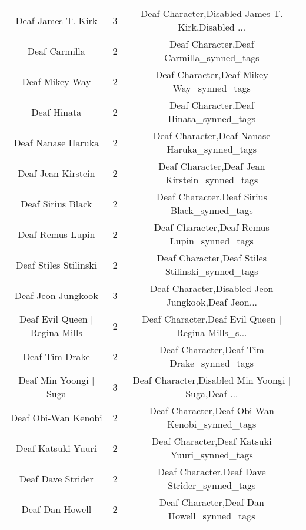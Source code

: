 \begin{table}[h!]
{\begin{tabular}{|c|c|c|}
                                Deaf James T. Kirk &          3 & Deaf Character,Disabled James T. Kirk,Disabled ... \\
                                     Deaf Carmilla &          2 &           Deaf Character,Deaf Carmilla\_synned\_tags \\
                                    Deaf Mikey Way &          2 &          Deaf Character,Deaf Mikey Way\_synned\_tags \\
                                       Deaf Hinata &          2 &             Deaf Character,Deaf Hinata\_synned\_tags \\
                                Deaf Nanase Haruka &          2 &      Deaf Character,Deaf Nanase Haruka\_synned\_tags \\
                                Deaf Jean Kirstein &          2 &      Deaf Character,Deaf Jean Kirstein\_synned\_tags \\
                                 Deaf Sirius Black &          2 &       Deaf Character,Deaf Sirius Black\_synned\_tags \\
                                  Deaf Remus Lupin &          2 &        Deaf Character,Deaf Remus Lupin\_synned\_tags \\
                             Deaf Stiles Stilinski &          2 &   Deaf Character,Deaf Stiles Stilinski\_synned\_tags \\
                                Deaf Jeon Jungkook &          3 & Deaf Character,Disabled Jeon Jungkook,Deaf Jeon... \\
                    Deaf Evil Queen | Regina Mills &          2 & Deaf Character,Deaf Evil Queen | Regina Mills\_s... \\
                                    Deaf Tim Drake &          2 &          Deaf Character,Deaf Tim Drake\_synned\_tags \\
                            Deaf Min Yoongi | Suga &          3 & Deaf Character,Disabled Min Yoongi | Suga,Deaf ... \\
                               Deaf Obi-Wan Kenobi &          2 &     Deaf Character,Deaf Obi-Wan Kenobi\_synned\_tags \\
                                Deaf Katsuki Yuuri &          2 &      Deaf Character,Deaf Katsuki Yuuri\_synned\_tags \\
                                 Deaf Dave Strider &          2 &       Deaf Character,Deaf Dave Strider\_synned\_tags \\
                                   Deaf Dan Howell &          2 &         Deaf Character,Deaf Dan Howell\_synned\_tags \\

\end{tabular}}
\end{table}
